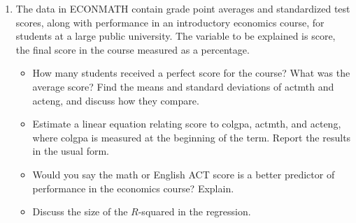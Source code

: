 \documentclass[12pt]{article}
\begin{document}
\begin{enumerate}
{\begin{lstlisting}
# Part (iii): What is the estimated increase in price for a house with an additional bedroom that is 140 square feet in size?
additional_increase <- coefficients["bdrms"] + 140 * coefficients["sqrft"]
cat("Estimated increase in price for an additional bedroom with 140 sqrft:", round(additional_increase, 4), "thousand dollars\n\n")

# Part (iv): What percentage of the variation in price is explained by square footage and number of bedrooms?
r_squared <- summary(model)$r.squared
cat("R-squared:", round(r_squared * 100, 2), "% of the variation in price is explained by sqrft and bdrms\n\n")

# Part (v): Find the predicted selling price for the first house (sqrft = 2438, bdrms = 4)
predicted_price_first_house <- predict(model, newdata = data.frame(sqrft = 2438, bdrms = 4))
cat("Predicted selling price for the first house:", round(predicted_price_first_house, 4), "thousand dollars\n\n")

# Part (vi): The actual selling price was $300,000 (price = 300). Find the residual for this house.
actual_price <- 300
residual <- actual_price - predicted_price_first_house
cat("Residual for the first house:", round(residual, 4), "thousand dollars\n\n")

# Interpretation: Does the residual suggest the buyer underpaid or overpaid?
if (residual > 0) {
  cat("The positive residual suggests that the buyer underpaid for the house.\n")
} else {
  cat("The negative residual suggests that the buyer overpaid for the house.\n")
}

\end{lstlisting}

}


\item The data in ECONMATH contain grade point averages and standardized test scores, along with performance in an introductory economics course, for students at a large public university. The variable to be explained is score, the final score in the course measured as a percentage.
\begin{itemize}
    \item How many students received a perfect score for the course? What was the average score? Find the means and standard deviations of actmth and acteng, and discuss how they compare.
\item Estimate a linear equation relating score to colgpa, actmth, and acteng, where colgpa is measured at the beginning of the term. Report the results in the usual form.
\item Would you say the math or English ACT score is a better predictor of performance in the economics course? Explain.
\item  Discuss the size of the $R$-squared in the regression.
\end{itemize}



\end{enumerate}
\end{document}
